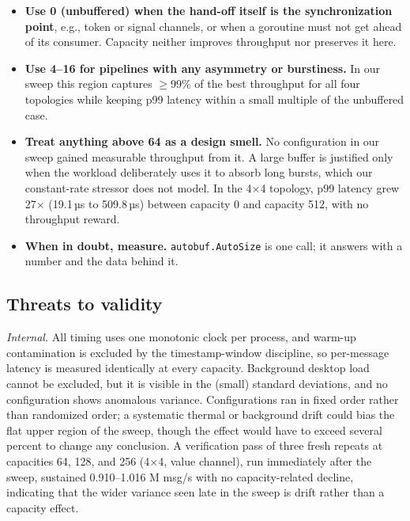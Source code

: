\documentclass[10pt,a4paper]{article}
\begin{document}
\begin{itemize}
  \item \textbf{Use 0 (unbuffered) when the hand-off itself is the
        synchronization point}, e.g., token or signal channels, or when a
        goroutine must not get ahead of its consumer. Capacity neither
        improves throughput nor preserves it here.
  \item \textbf{Use 4--16 for pipelines with any asymmetry or burstiness.}
        In our sweep this region captures $\geq$99\% of the best throughput for
        all four topologies while keeping p99 latency within a small multiple
        of the unbuffered case.
  \item \textbf{Treat anything above 64 as a design smell.} No configuration
        in our sweep gained measurable throughput from it. A
        large buffer is justified only when the workload deliberately uses it
        to absorb long bursts, which our constant-rate stressor does not model.
        In the 4$\times$4 topology, p99 latency grew 27$\times$ (19.1\,µs to
        509.8\,µs) between capacity 0 and capacity 512, with no throughput
        reward.
  \item \textbf{When in doubt, measure.} \texttt{autobuf.AutoSize} is one call;
        it answers with a number and the data behind it.
\end{itemize}

\subsection{Threats to validity}
\label{sec:guidance-threats}

\emph{Internal.} All timing uses one monotonic clock per process, and warm-up
contamination is excluded by the timestamp-window discipline, so per-message
latency is measured identically at every capacity. Background desktop load
cannot be excluded, but it is visible in the (small) standard deviations, and
no configuration shows anomalous variance. Configurations ran in fixed order
rather than randomized order; a systematic thermal or background drift could
bias the flat upper region of the sweep, though the effect would have to
exceed several percent to change any conclusion. A verification pass of
three fresh repeats at capacities 64, 128, and 256 (4$\times$4, value
channel), run immediately after the sweep, sustained 0.910--1.016 M msg/s
with no capacity-related decline, indicating that the wider variance seen
late in the sweep is drift rather than a capacity effect.
\end{document}
